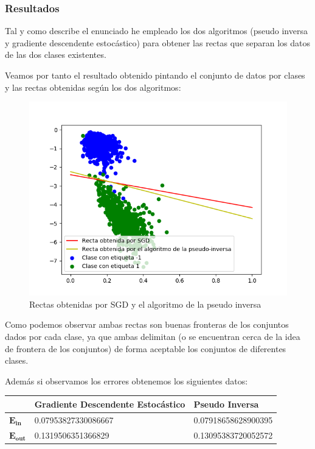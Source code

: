 \documentclass[12pt,a4paper]{article}
\begin{document}
\subsubsection{Resultados}

Tal y como describe el enunciado he empleado los dos algoritmos (pseudo inversa y gradiente descendente estocástico) para obtener las rectas que separan los datos de las dos clases existentes.

Veamos por tanto el resultado obtenido pintando el conjunto de datos por clases y las rectas obtenidas según los dos algoritmos:

\begin{figure}[H]
	\centering
	\includegraphics[scale=0.8]{./Imagenes/ej2-1_w.png}
	\caption{Rectas obtenidas por SGD y el algoritmo de la pseudo inversa}
	\label{ej2-1_w}
\end{figure}

Como podemos observar ambas rectas son buenas fronteras de los conjuntos dados por cada clase, ya que ambas delimitan (o se encuentran cerca de la idea de frontera de los conjuntos) de forma aceptable los conjuntos de diferentes clases.

Además si observamos los errores obtenemos los siguientes datos:

\begin{table}[H]
	\begin{tabular}{|l|l|l|}
		\hline
		& \textbf{Gradiente Descendente Estocástico} & \textbf{Pseudo Inversa}      \\ \hline \hline
		$\mathbf{E_{in}}$  & 0.07953827330086667               & 0.07918658628900395 \\ \hline
		$\mathbf{E_{out}}$ & 0.1319506351366829               & 0.13095383720052572 \\ \hline
	\end{tabular}
\end{table}
\end{document}
